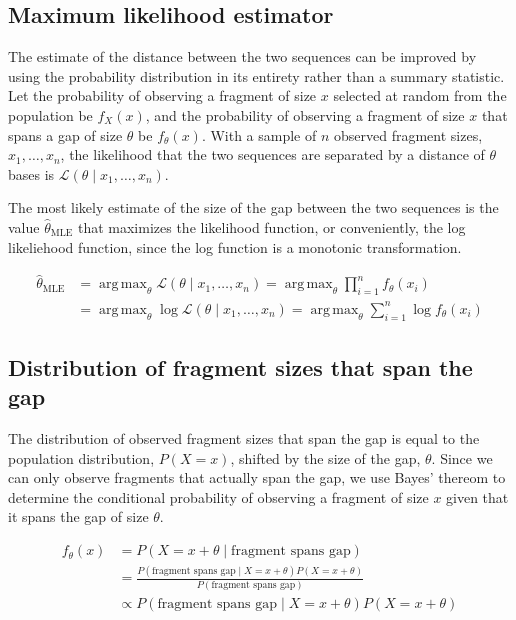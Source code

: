 \documentclass[letterpaper,12pt]{article}
\DeclareMathOperator*{\argmax}{arg\,max}
\DeclareMathOperator{\MLE}{MLE}
\begin{document}
\subsection*{Maximum likelihood estimator}

The estimate of the distance between the two sequences can be improved
by using the probability distribution in its entirety rather than a
summary statistic. Let the probability of observing a fragment of size
$x$ selected at random from the population be $f_X(x)$, and the
probability of observing a fragment of size $x$ that spans a gap of
size $\theta$ be $f_\theta(x)$. With a sample of $n$ observed fragment
sizes, $x_1, \dotsc , x_n$, the likelihood that the two sequences are
separated by a distance of $\theta$ bases is $\mathcal{L}(\theta \mid
x_1, \dotsc , x_n)$.

The most likely estimate of the size of the gap between the two
sequences is the value $\hat \theta_{\MLE}$ that maximizes the
likelihood function, or conveniently, the log likeliehood function,
since the log function is a monotonic transformation.

\begin{align*}
\hat \theta_{\MLE}
&= \argmax_\theta \mathcal{L}(\theta \mid x_1, \dotsc, x_n)
	= \argmax_\theta \prod_{i=1}^n f_\theta(x_i) \\
&= \argmax_\theta \log \mathcal{L}(\theta \mid x_1, \dotsc, x_n)
	= \argmax_\theta \sum_{i=1}^n \log f_\theta(x_i)
\end{align*}

\subsection*{Distribution of fragment sizes that span the gap}

The distribution of observed fragment sizes that span the gap is equal
to the population distribution, $P(X=x)$, shifted by the size of the
gap, $\theta$. Since we can only observe fragments that actually span
the gap, we use Bayes' thereom to determine the conditional
probability of observing a fragment of size $x$ given that it spans
the gap of size $\theta$.

\begin{align*}
f_{\theta}(x)
&= P(X=x+\theta \mid \text{fragment spans gap}) \\
&= \frac{ P(\text{fragment spans gap} \mid X=x+\theta) P(X=x+\theta) }
{ P(\text{fragment spans gap}) } \\
&\propto P(\text{fragment spans gap} \mid X=x+\theta) P(X=x+\theta)
\end{align*}
\end{document}
